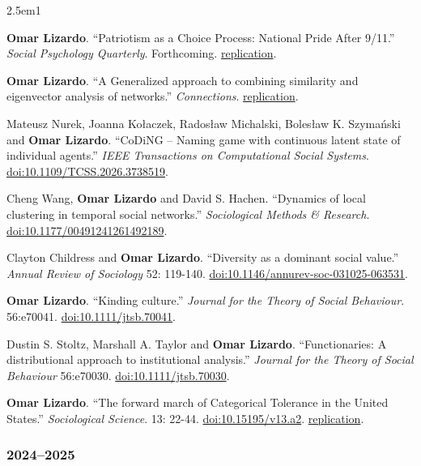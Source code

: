 \documentclass[
]{article}
\newenvironment{cventry}{\begin{hangparas}{2.5em}{1}}{\end{hangparas}}
\begin{document}
\begin{cventry}

\textbf{Omar Lizardo}. ``Patriotism as a Choice Process: National Pride
After 9/11.'' \emph{Social Psychology Quarterly}. Forthcoming.
\href{https://github.com/olizardo/patriotism-choice-process}{
replication}.

\textbf{Omar Lizardo}. ``A Generalized approach to combining similarity
and eigenvector analysis of networks.'' \emph{Connections}.
\href{https://github.com/olizardo/combining-similarity-eigenvector}{
replication}.

Mateusz Nurek, Joanna Kołaczek, Radosław Michalski, Bolesław K.
Szymański and \textbf{Omar Lizardo}. ``CoDiNG -- Naming game with
continuous latent state of individual agents.'' \emph{IEEE Transactions
on Computational Social Systems}.
\href{https://doi.org/10.1109/TCSS.2026.3738519}{doi:10.1109/TCSS.2026.3738519}.

Cheng Wang, \textbf{Omar Lizardo} and David S. Hachen. ``Dynamics of
local clustering in temporal social networks.'' \emph{Sociological
Methods \& Research}.
\href{https://doi.org/10.1177/00491241261492189}{doi:10.1177/00491241261492189}.

Clayton Childress and \textbf{Omar Lizardo}. ``Diversity as a dominant
social value.'' \emph{Annual Review of Sociology} 52: 119-140.
\href{https://doi.org/10.1146/annurev-soc-031025-063531}{doi:10.1146/annurev-soc-031025-063531}.

\textbf{Omar Lizardo}. ``Kinding culture.'' \emph{Journal for the Theory
of Social Behaviour}. 56:e70041.
\href{https://doi.org/10.1111/jtsb.70041}{doi:10.1111/jtsb.70041}.

Dustin S. Stoltz, Marshall A. Taylor and \textbf{Omar Lizardo}.
``Functionaries: A distributional approach to institutional analysis.''
\emph{Journal for the Theory of Social Behaviour} 56:e70030.
\href{https://doi.org/10.1111/jtsb.70030}{doi:10.1111/jtsb.70030}.

\textbf{Omar Lizardo}. ``The forward march of Categorical Tolerance in
the United States.'' \emph{Sociological Science}. 13: 22-44.
\href{https://doi.org/10.15195/v13.a2}{doi:10.15195/v13.a2}.
\href{https://github.com/olizardo/sociological-science-categorical-tolerance-followup}{
replication}.

\end{cventry}

\subsubsection{2024--2025}\label{section}
\end{document}
